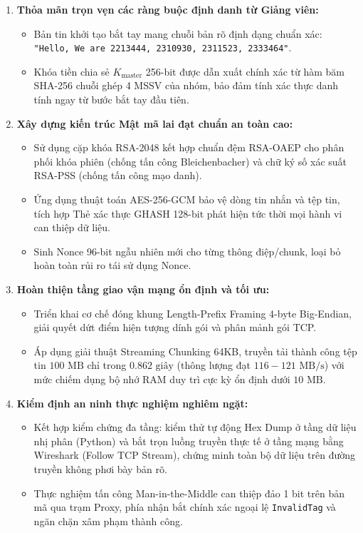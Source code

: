 \documentclass[a4paper,12pt]{article}
\begin{document}
\begin{enumerate}
    \item \textbf{Thỏa mãn trọn vẹn các ràng buộc định danh từ Giảng viên:}
    \begin{itemize}
        \item Bản tin khởi tạo bắt tay mang chuỗi bản rõ định dạng chuẩn xác: \texttt{"Hello, We are 2213444, 2310930, 2311523, 2333464"}.
        \item Khóa tiền chia sẻ $K_{\text{master}}$ 256-bit được dẫn xuất chính xác từ hàm băm SHA-256 chuỗi ghép 4 MSSV của nhóm, bảo đảm tính xác thực danh tính ngay từ bước bắt tay đầu tiên.
    \end{itemize}
    \item \textbf{Xây dựng kiến trúc Mật mã lai đạt chuẩn an toàn cao:}
    \begin{itemize}
        \item Sử dụng cặp khóa RSA-2048 kết hợp chuẩn đệm RSA-OAEP cho phân phối khóa phiên (chống tấn công Bleichenbacher) và chữ ký số xác suất RSA-PSS (chống tấn công mạo danh).
        \item Ứng dụng thuật toán AES-256-GCM bảo vệ dòng tin nhắn và tệp tin, tích hợp Thẻ xác thực GHASH 128-bit phát hiện tức thời mọi hành vi can thiệp dữ liệu.
        \item Sinh Nonce 96-bit ngẫu nhiên mới cho từng thông điệp/chunk, loại bỏ hoàn toàn rủi ro tái sử dụng Nonce.
    \end{itemize}
    \item \textbf{Hoàn thiện tầng giao vận mạng ổn định và tối ưu:}
    \begin{itemize}
        \item Triển khai cơ chế đóng khung Length-Prefix Framing 4-byte Big-Endian, giải quyết dứt điểm hiện tượng dính gói và phân mảnh gói TCP.
        \item Áp dụng giải thuật Streaming Chunking 64KB, truyền tải thành công tệp tin $100\text{ MB}$ chỉ trong $0.862\text{ giây}$ (thông lượng đạt $116 - 121\text{ MB/s}$) với mức chiếm dụng bộ nhớ RAM duy trì cực kỳ ổn định dưới $10\text{ MB}$.
    \end{itemize}
    \item \textbf{Kiểm định an ninh thực nghiệm nghiêm ngặt:}
    \begin{itemize}
        \item Kết hợp kiểm chứng đa tầng: kiểm thử tự động Hex Dump ở tầng dữ liệu nhị phân (Python) và bắt trọn luồng truyền thực tế ở tầng mạng bằng Wireshark (Follow TCP Stream), chứng minh toàn bộ dữ liệu trên đường truyền không phơi bày bản rõ.
        \item Thực nghiệm tấn công Man-in-the-Middle can thiệp đảo 1 bit trên bản mã qua trạm Proxy, phía nhận bắt chính xác ngoại lệ \texttt{InvalidTag} và ngăn chặn xâm phạm thành công.
    \end{itemize}
\end{enumerate}
\end{document}
